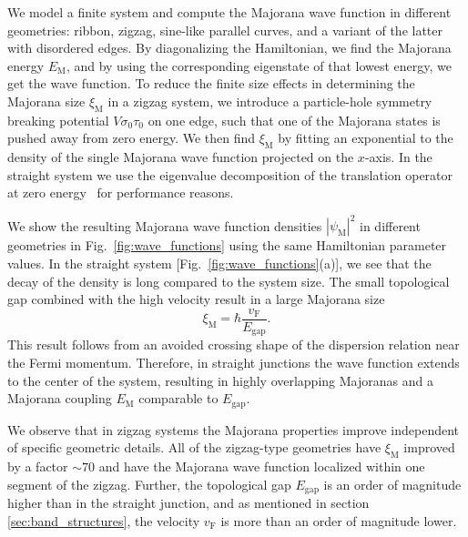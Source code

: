 \documentclass[english, twocolumn, 10pt, aps, superscriptaddress, floatfix, prb, citeautoscript]{revtex4-1}
\renewcommand{\comment}[2]{#2}
\begin{document}
\comment{We calculate the wave functions and find the Majorana lengths by fitting an exponential.}
We model a finite system and compute the Majorana wave function in different geometries: ribbon, zigzag, sine-like parallel curves, and a variant of the latter with disordered edges.
By diagonalizing the Hamiltonian, we find the Majorana energy $E_\textrm{M}$, and by using the corresponding eigenstate of that lowest energy, we get the wave function.
To reduce the finite size effects in determining the Majorana size $\xi_\textrm{M}$ in a zigzag system, we introduce a particle-hole symmetry breaking potential $V \sigma_0 \tau_0$ on one edge, such that one of the Majorana states is pushed away from zero energy.
We then find $\xi_\textrm{M}$ by fitting an exponential to the density of the single Majorana wave function projected on the $x$-axis.
In the straight system we use the eigenvalue decomposition of the translation operator at zero energy~\cite{Nijholt2015} for performance reasons.

\comment{In a straight system, the Majoranas are very poorly localized because of small gap and high velocity}
We show the resulting Majorana wave function densities $\left| \psi_\textrm{M} \right|^2$ in different geometries in Fig.~\ref{fig:wave_functions} using the same Hamiltonian parameter values.
In the straight system [Fig.~\ref{fig:wave_functions}(a)], we see that the decay of the density is long compared to the system size.
The small topological gap combined with the high velocity result in a large Majorana size
\begin{equation}
\label{eq:xi_M}
\xi_\textrm{M}=\hbar \frac{v_\textrm{F}}{E_\textrm{gap}}.
\end{equation}
This result follows from an avoided crossing shape of the dispersion relation near the Fermi momentum.
Therefore, in straight junctions the wave function extends to the center of the system, resulting in highly overlapping Majoranas and a Majorana coupling $E_\textrm{M}$ comparable to $E_\textrm{gap}$.

\comment{In a zigzag geometry Majoranas are localized within one segment of zigzag independent of details}
We observe that in zigzag systems the Majorana properties improve independent of specific geometric details.
All of the zigzag-type geometries have $\xi_\textrm{M}$ improved by a factor $\sim 70$ and have the Majorana wave function localized within one segment of the zigzag.
Further, the topological gap $E_\textrm{gap}$ is an order of magnitude higher than in the straight junction, and as mentioned in section \ref{sec:band_structures}, the velocity $v_\textrm{F}$ is more than an order of magnitude lower.
\end{document}
